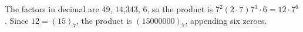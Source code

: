 The factors in decimal are 49, 14,343, 6, so the product is $ 7^2(2\cdot7)7^3\cdot6=12\cdot7^6 $. Since $ 12=(15)_7 $, the product is $\boxed{(15000000)_7}$, appending six zeroes.
